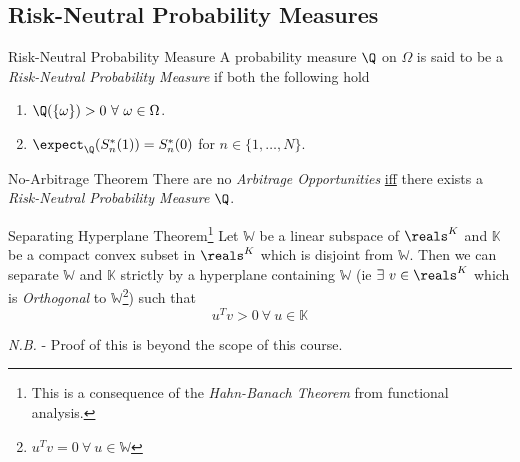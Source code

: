 \documentclass[11pt,a4paper]{article}
\begin{document}
\subsection{Risk-Neutral Probability Measures}

  \begin{definition}{Risk-Neutral Probability Measure}
    A probability measure $\Q$ on $\Omega$ is said to be a \textit{Risk-Neutral Probability Measure} if both the following hold
    \begin{enumerate}
      \item $\Q(\{\omega\})>0\ \forall\ \omega\in\Omega$.
      \item $\expect_\Q(S_n^*(1))=S_n^*(0)$ for $n\in\{1,\dots,N\}$.
    \end{enumerate}
  \end{definition}

  \begin{theorem}{No-Arbitrage Theorem}
    There are no \textit{Arbitrage Opportunities} \underline{iff} there exists a \textit{Risk-Neutral Probability Measure} $\Q$.
  \end{theorem}

  \begin{theorem}{Separating Hyperplane Theorem\footnote{This is a consequence of the \textit{Hahn-Banach Theorem} from functional analysis.}}
    Let $\mathbb{W}$ be a linear subspace of $\reals^K$ and $\mathbb{K}$ be a compact convex subset in $\reals^K$ which is disjoint from $\mathbb{W}$. Then we can separate $\mathbb{W}$ and $\mathbb{K}$ strictly by a hyperplane containing $\mathbb{W}$ (ie $\exists\ v\in\reals^K$ which is \textit{Orthogonal} to $\mathbb{W}$\footnote{$u^Tv=0\ \forall\ u\in\mathbb{W}$}) such that
    \[ u^Tv>0\ \forall\ u\in\mathbb{K} \]

    \textit{N.B.} - Proof of this is beyond the scope of this course.
  \end{theorem}
\end{document}
